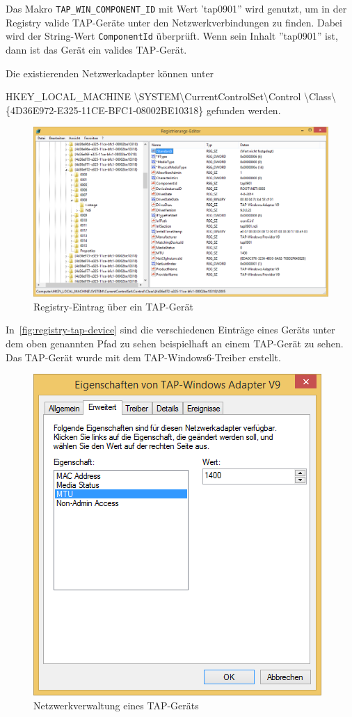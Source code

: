 Das Makro \texttt{TAP\_WIN\_COMPONENT\_ID} mit Wert 'tap0901'' wird genutzt, um in der Registry
valide TAP-Geräte unter den Netzwerkverbindungen zu finden. Dabei wird der String-Wert \texttt{ComponentId}
überprüft. Wenn sein Inhalt ''tap0901'' ist, dann ist das Gerät ein valides TAP-Gerät.

Die existierenden Netzwerkadapter können unter {HKEY\_LOCAL\_MACHINE\linebreak
\textbackslash{}SYSTEM\textbackslash{}CurrentControlSet\textbackslash{}Control
\textbackslash{}Class\textbackslash{}\{4D36E972-E325-11CE-BFC1-08002BE10318\} gefunden werden.

\begin{figure}[!h]
\caption{Registry-Eintrag über ein TAP-Gerät}
\label{fig:registry-tap-device}
\includegraphics[width=\textwidth]{Windows-Registry-TAP-Device.png}
\end{figure}

In~\autoref{fig:registry-tap-device} sind die verschiedenen Einträge eines Geräts unter
dem oben genannten Pfad zu sehen beispielhaft an einem TAP-Gerät zu sehen. Das TAP-Gerät
wurde mit dem TAP-Windows6-Treiber erstellt.

\begin{figure}[!h]
\caption{Netzwerkverwaltung eines TAP-Geräts}
\label{fig:networkmanager-extended}
\includegraphics{Windows-NetworkManager-Extended.png}
\end{figure}

}
